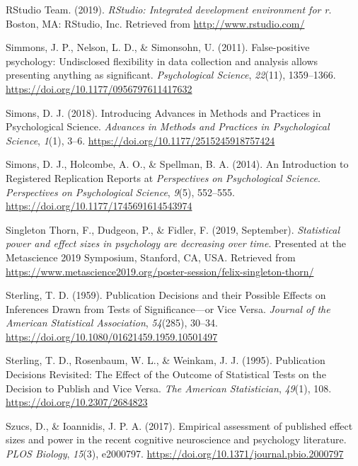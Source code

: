 \documentclass[british,,jou,floatsintext]{apa6}
\begin{document}
\leavevmode\hypertarget{ref-RStudioTeam2019}{}%
RStudio Team. (2019). \emph{RStudio: Integrated development environment for r}. Boston, MA: RStudio, Inc. Retrieved from \url{http://www.rstudio.com/}

\leavevmode\hypertarget{ref-Simmons2011}{}%
Simmons, J. P., Nelson, L. D., \& Simonsohn, U. (2011). False-positive psychology: Undisclosed flexibility in data collection and analysis allows presenting anything as significant. \emph{Psychological Science}, \emph{22}(11), 1359--1366. \url{https://doi.org/10.1177/0956797611417632}

\leavevmode\hypertarget{ref-Simons2018}{}%
Simons, D. J. (2018). Introducing Advances in Methods and Practices in Psychological Science. \emph{Advances in Methods and Practices in Psychological Science}, \emph{1}(1), 3--6. \url{https://doi.org/10.1177/2515245918757424}

\leavevmode\hypertarget{ref-Simons2014}{}%
Simons, D. J., Holcombe, A. O., \& Spellman, B. A. (2014). An Introduction to Registered Replication Reports at \emph{Perspectives} \emph{on} \emph{Psychological Science}. \emph{Perspectives on Psychological Science}, \emph{9}(5), 552--555. \url{https://doi.org/10.1177/1745691614543974}

\leavevmode\hypertarget{ref-SingletonThorn2019}{}%
Singleton Thorn, F., Dudgeon, P., \& Fidler, F. (2019, September). \emph{Statistical power and effect sizes in psychology are decreasing over time}. Presented at the Metascience 2019 Symposium, Stanford, CA, USA. Retrieved from \url{https://www.metascience2019.org/poster-session/felix-singleton-thorn/}

\leavevmode\hypertarget{ref-Sterling1959}{}%
Sterling, T. D. (1959). Publication Decisions and their Possible Effects on Inferences Drawn from Tests of Significance---or Vice Versa. \emph{Journal of the American Statistical Association}, \emph{54}(285), 30--34. \url{https://doi.org/10.1080/01621459.1959.10501497}

\leavevmode\hypertarget{ref-Sterling1995}{}%
Sterling, T. D., Rosenbaum, W. L., \& Weinkam, J. J. (1995). Publication Decisions Revisited: The Effect of the Outcome of Statistical Tests on the Decision to Publish and Vice Versa. \emph{The American Statistician}, \emph{49}(1), 108. \url{https://doi.org/10.2307/2684823}

\leavevmode\hypertarget{ref-Szucs2017}{}%
Szucs, D., \& Ioannidis, J. P. A. (2017). Empirical assessment of published effect sizes and power in the recent cognitive neuroscience and psychology literature. \emph{PLOS Biology}, \emph{15}(3), e2000797. \url{https://doi.org/10.1371/journal.pbio.2000797}
\end{document}
